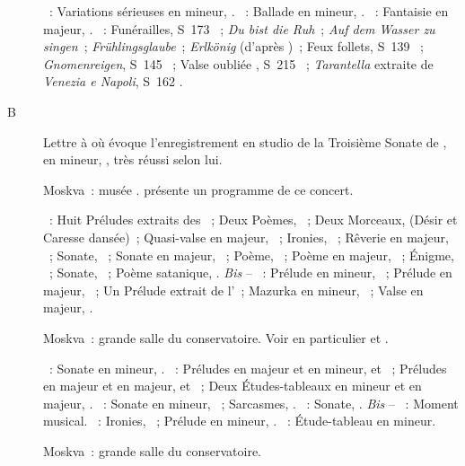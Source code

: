 \begin{description}
 \textsc{\Mendelssohn{}}~: Variations sérieuses en \kD mineur, .
 \textsc{\Brahms{}}~: Ballade en \kG mineur,  .
 \textsc{\Schumann{}}~: Fantaisie en \kC majeur, .
 \textsc{\Liszt{}}~: Funérailles, S~173 ~; \emph{Du bist die
 Ruh}~; \emph{Auf dem Wasser zu singen}~; \emph{Frühlingsglaube}~;
 \emph{Erlkönig} (d'après \Schubert{})~; Feux follets, S~139 ~;
 \emph{Gnomenreigen}, S~145 ~; Valse oubliée , S~215
 ~; \emph{Tarantella} extraite de \emph{Venezia e Napoli}, S~162
 .
 \item[B\DateWithWeekDay{1946-08-15}]
 Lettre à \AVizel{} \citep[voir][p.~167-168]{Nekrasova08} où \VSofronitsky{}
 évoque l'enregistrement en studio de la Troisième Sonate de \Scriabine{},
 en \kF \Sharp mineur, , très réussi selon lui.
 \item[\DateWithWeekDay{1946-09-01}]
 Moskva~: musée \Scriabine{}.
 \citet{Lazarev20} présente un programme de ce concert.

 \textsc{\Scriabine{}}~: Huit Préludes extraits des ~; Deux Poèmes, ~; Deux Morceaux,  (Désir et
 Caresse dansée)~; Quasi-valse en \kF majeur, ~; Ironies, 
 ~; Rêverie en \kC majeur,  ~; Sonate,
 ~; Sonate en \kF \Sharp majeur, ~; Poème, 
 ~; Poème en \kF \Sharp majeur,  ~; Énigme,
  ~; Sonate, ~; Poème satanique, .
 \emph{Bis} -- \textsc{\Scriabine{}}~: Prélude en \kE mineur, 
 ~; Prélude en \kD majeur,  ~; Un Prélude
 extrait de l'~; Mazurka en \kE mineur,  ~;
 Valse en \kA \Flat majeur, .
 \item[\DateWithWeekDay{1946-10-25}]
 Moskva~: grande salle du conservatoire.
 Voir en particulier \citet[p.~442-443]{Milshteyn82a} et
 \citet[p.~395]{Nikonovich08}.

 \textsc{\Glazounov{}}~: Sonate en \kB \Flat mineur, .
 \textsc{\Rachmaninov{}}~: Préludes en \kD majeur et en \kC mineur,
   et ~; Préludes en \kE majeur et en \kG
 majeur,   et ~; Deux Études-tableaux en \kA
 mineur et en \kE \Flat majeur, .
 \textsc{\Prokofiev{}}~: Sonate en \kA mineur, ~; Sarcasmes,
 .
 \textsc{\Scriabine{}}~: Sonate, .
 \emph{Bis} -- \textsc{\Rachmaninov{}}~: Moment musical.
 \textsc{\Scriabine{}}~: Ironies,  ~; Prélude en \kC
 mineur, .
 \textsc{\Rachmaninov{}}~: Étude-tableau en \kA mineur.
 \item[\DateWithWeekDay{1946-11-12}]
 Moskva~: grande salle du conservatoire.


\end{description}
